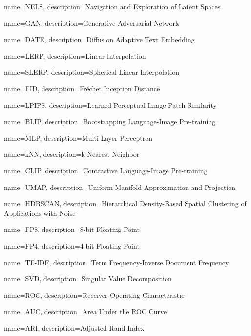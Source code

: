 {
    name={NELS},
    description={Navigation and Exploration of Latent Spaces}
}

{
    name={GAN},
    description={Generative Adversarial Network}
}

{
    name={DATE},
    description={Diffusion Adaptive Text Embedding}
}

{
    name={LERP},
    description={Linear Interpolation}
}

{
    name={SLERP},
    description={Spherical Linear Interpolation}
}

{
    name={FID},
    description={Fréchet Inception Distance}
}

{
    name={LPIPS},
    description={Learned Perceptual Image Patch Similarity}
}

{
    name={BLIP},
    description={Bootstrapping Language-Image Pre-training}
}

{
    name={MLP},
    description={Multi-Layer Perceptron}
}

{
    name={kNN},
    description={k-Nearest Neighbor}
}

{
    name={CLIP},
    description={Contrastive Language-Image Pre-training}
}

{
    name={UMAP},
    description={Uniform Manifold Approximation and Projection}
}

{
    name={HDBSCAN},
    description={Hierarchical Density-Based Spatial Clustering of Applications with Noise}
}

{
    name={FP8},
    description={8-bit Floating Point}
}

{
    name={FP4},
    description={4-bit Floating Point}
}

{
    name={TF-IDF},
    description={Term Frequency-Inverse Document Frequency}
}

{
    name={SVD},
    description={Singular Value Decomposition}
}

{
    name={ROC},
    description={Receiver Operating Characteristic}
}

{
    name={AUC},
    description={Area Under the ROC Curve}
}

{
    name={ARI},
    description={Adjusted Rand Index}
}

\glsaddall

